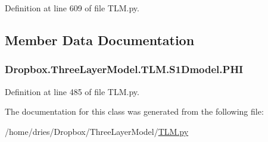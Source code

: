 Definition at line 609 of file T\+L\+M.\+py.



\subsection{Member Data Documentation}
\hypertarget{classDropbox_1_1ThreeLayerModel_1_1TLM_1_1S1Dmodel_a498caac838b8c8bdf4018a2e4efb9a27}{
\subsubsection[{P\+H\+I}]{\setlength{\rightskip}{0pt plus 5cm}Dropbox.\+Three\+Layer\+Model.\+T\+L\+M.\+S1\+Dmodel.\+P\+H\+I}}\label{classDropbox_1_1ThreeLayerModel_1_1TLM_1_1S1Dmodel_a498caac838b8c8bdf4018a2e4efb9a27}


Definition at line 485 of file T\+L\+M.\+py.



The documentation for this class was generated from the following file\+:\begin{DoxyCompactItemize}
\item 
/home/dries/\+Dropbox/\+Three\+Layer\+Model/\hyperlink{TLM_8py}{T\+L\+M.\+py}\end{DoxyCompactItemize}

